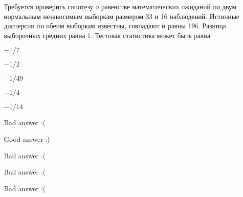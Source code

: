 
\begin{question}
Требуется проверить гипотезу о равенстве математических ожиданий по двум
нормальным независимым выборкам размером 33 и 16 наблюдений. Истинные
дисперсии по обеим выборкам известны, совпадают и равны 196. Разница
выборочных средних равна 1. Тестовая статистика может быть равна
\begin{answerlist}
  \item \(-1/7\)
  \item \(-1/2\)
  \item \(-1/49\)
  \item \(-1/4\)
  \item \(-1/14\)
\end{answerlist}
\end{question}

\begin{solution}
\begin{answerlist}
  \item Bad answer :(
  \item Good answer :)
  \item Bad answer :(
  \item Bad answer :(
  \item Bad answer :(
\end{answerlist}
\end{solution}

